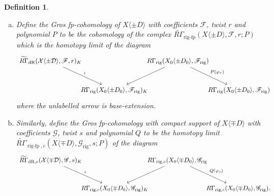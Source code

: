 \documentclass[cjm]{ipart}
\theoremstyle{plain}
\newtheorem{definition}[theorem]{Definition}
\theoremstyle{remark}
\DeclareMathOperator{\rigfp}{rig-fp}
\newcommand{\RGt}{\widetilde{R\Gamma}}
\newcommand{\cD}{\mathcal{D}}
\newcommand{\cX}{\mathcal{X}}
\newcommand{\dR}{\mathrm{dR}}
\newcommand{\rig}{\mathrm{rig}}
\newcommand{\sF}{\mathscr{F}}
\newcommand{\sG}{\mathscr{G}}
\numberwithin{equation}{subsection}
\begin{document}
  \begin{definition}\label{def:grosfp} \
   \begin{enumerate}[(a)]
    \item Define the \emph{Gros fp-cohomology} of $X\langle \pm D\rangle$ with coefficients $\sF$, twist $r$ and polynomial $P$ to be the cohomology of the complex $\RGt_{\rigfp}(X\langle \pm D\rangle,\sF,r;P)$ which is the homotopy limit of the diagram
    \[
     \begin{tikzcd}[row sep=large, column sep=-1em]
      \RGt_{\dR}(\cX\langle \pm \cD\rangle,\sF, r)_K 
       \arrow[rd, "\iota"] &
      {} & 
      R\Gamma_{\rig}(X_0\langle \pm D_0\rangle,\sF_{\rig}) 
       \arrow[rd, "P(\varphi_r)"] 
       \arrow[ld] \\
      {} & 
      R\Gamma_{\rig}(X_0\langle \pm D_0\rangle,\sF_{\rig})_K & 
      {} & 
      R\Gamma_{\rig}(X_0\langle \pm D_0\rangle,\sF_{\rig})
     \end{tikzcd}
    \]
    where the unlabelled arrow is base-extension.

    \item Similarly, define the \emph{Gros fp-cohomology with compact support} of $X\langle \mp D\rangle$ with coefficients $\sG$, twist $s$ and polynomial $Q$ to be the homotopy limit $\RGt_{\rigfp,c}(X\langle \mp D\rangle,\sG_{\rig},s;P)$ of the diagram
    \[
     \begin{tikzcd}[row sep=large, column sep=-1em]
      \RGt_{\dR,c}(\cX\langle \mp \cD\rangle,\sG,s)_K 
       \arrow[rd, "\iota"] &
      {} & 
      R\Gamma_{\rig,c}(X_0\langle \mp D_0\rangle, \sG_{\rig} 
       \arrow[rd, "Q(\varphi_s)"] 
       \arrow[ld] \\
      {} & 
      R\Gamma_{\rig,c}(X_0\langle \mp D_0\rangle,\sG_{\rig})_K & 
      {} & 
      R\Gamma_{\rig, c}(X_0\langle \mp D_0\rangle,\sG_{\rig}).
     \end{tikzcd}
    \]
   \end{enumerate}
  \end{definition}
\end{document}
